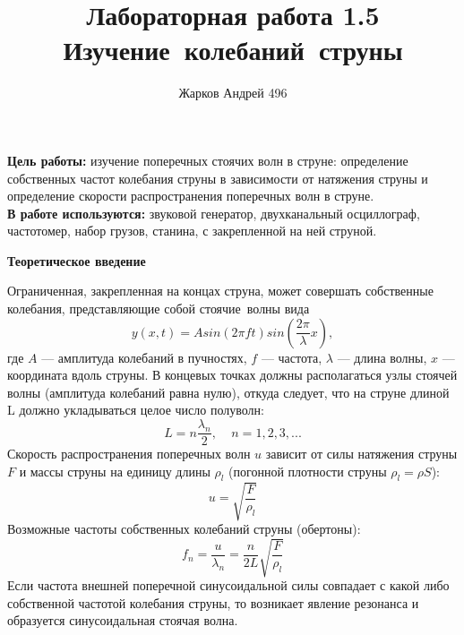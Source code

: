 \documentclass[12pt]{article}
\begin{document}
	\author {Жарков Андрей 496}
	\title {Лабораторная работа 1.5 \\ Изучение колебаний струны}
	\maketitle{}
	
	\indent
	\textbf{Цель работы:} изучение поперечных стоячих волн в струне: определение собственных частот колебания струны в зависимости от натяжения струны и определение скорости распространения поперечных волн в струне. 
	\\\newline
	\indent
	\textbf{В работе используются:} звуковой генератор, двухканальный осциллограф, частотомер, набор грузов, станина, с закрепленной на ней струной.
	
	\begin{center}
		\textbf{Теоретическое введение}
	\end{center}
	Ограниченная, закрепленная на концах струна, может совершать собственные колебания, представляющие собой стоячие волны вида
	$$y(x, t) = Asin(2\pi ft)sin(\frac{2\pi}{\lambda}x),$$
	где $A$ — амплитуда колебаний в пучностях, $f$ — частота, $\lambda$ — длина
	волны, $x$ — координата вдоль струны. В концевых точках должны располагаться узлы стоячей волны (амплитуда колебаний равна нулю), откуда
	следует, что на струне длиной L должно укладываться целое число полуволн:
	$$L = n\frac{\lambda_n}{2}, \ \ \ \ \ n = 1, 2, 3,...$$
	Скорость распространения поперечных волн $u$ зависит от силы натяжения струны $F$ и массы струны на единицу длины $\rho_l$ (погонной плотности
	струны $\rho_l = \rho S$): 
	\begin{equation}
	u = \sqrt{\frac{F}{\rho_l}}
	\end{equation} 
	Возможные частоты собственных колебаний струны (обертоны):
	\begin{equation}
	f_n = \frac{u}{\lambda_n} = \frac{n}{2L}\sqrt{\frac{F}{\rho_l}}
	\end{equation}
	Если частота внешней поперечной синусоидальной силы совпадает с
	какой либо собственной частотой колебания струны, то возникает явление
	резонанса и образуется синусоидальная стоячая волна.
	
\end{document}
